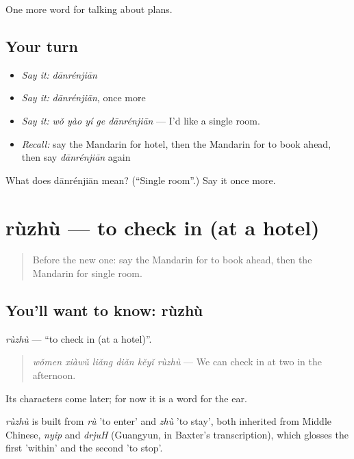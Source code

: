 \begin{grammarlens}[title={What you've built}]
One more word for talking about plans.
\end{grammarlens}

\subsection*{Your turn}
\begin{itemize}
\raggedright
  \item \emph{Say it:} \emph{dānrénjiān}
  \item \emph{Say it:} \emph{dānrénjiān}, once more
  \item \emph{Say it:} \emph{wǒ yào yí ge dānrénjiān} — I'd like a single room.
  \item \emph{Recall:} say the Mandarin for hotel, then the Mandarin for to book ahead, then say \emph{dānrénjiān} again
\end{itemize}

\begin{tcolorbox}[breakable,colback=teal!4,colframe=teal!35!black,title={Before you move on}]
What does dānrénjiān mean? (\textquotedblleft{}Single room\textquotedblright{}.) Say it once more.
\end{tcolorbox}
\section[rùzhù]{rùzhù — to check in (at a hotel)}

\label{lesson:ZH-C200-ruzhu}



\begin{quote}
Before the new one: say the Mandarin for to book ahead, then the Mandarin for single room.
\end{quote}

\subsection*{You'll want to know: rùzhù}
\emph{rùzhù} — \textquotedblleft{}to check in (at a hotel)\textquotedblright{}.

\begin{quote}
\emph{wǒmen xiàwǔ liǎng diǎn kěyǐ rùzhù} — We can check in at two in the afternoon.
\end{quote}

Its characters come later; for now it is a word for the ear.

\begin{cousinweb}
\emph{rùzhù} is built from \emph{rù} 'to enter' and \emph{zhù} 'to stay', both inherited from Middle Chinese, \emph{nyip} and \emph{drjuH} (Guangyun, in Baxter's transcription), which glosses the first 'within' and the second 'to stop'.
\end{cousinweb}

